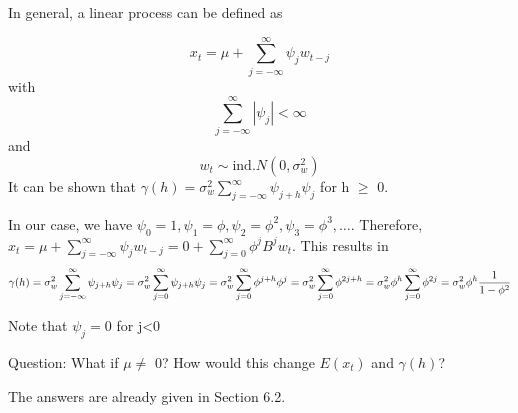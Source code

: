 \documentclass[
]{book}
\theoremstyle{definition}
\theoremstyle{definition}
\theoremstyle{definition}
\theoremstyle{definition}
\theoremstyle{remark}
\begin{document}
In general, a linear process can be defined as

\[x_t=\mu+\sum_{j=-\infty}^{\infty}\psi_jw_{t-j}\] with \[\sum_{j=-\infty}^{\infty}|\psi_j|<\infty\] and \[w_t\sim\mathrm{ind.}N(0,\sigma_w^2)\]
It can be shown that \(\gamma(h)=\sigma_w^2\sum_{j=-\infty}^{\infty} \psi_{j+h}\psi_j\) for h \(\ge\) 0.

In our case, we have \(\psi_0 = 1, \psi_1 = \phi, \psi_2 = \phi^2, \psi_3 = \phi^3, … .\) Therefore, \(x_t=\mu+\sum_{j=-\infty}^{\infty}\psi_jw_{t-j}=0+\sum_{j=0}^{\infty}\phi^jB^jw_t.\) This results in \[\gamma(h)=\sigma^2_w\sum_{j=-\infty}^{\infty}\psi_{j+h}\psi_j\\
=\sigma^2_w\sum_{j=0}^{\infty}\psi_{j+h}\psi_j\\
=\sigma^2_w\sum_{j=0}^{\infty}\phi^{j+h}\phi^j\\
=\sigma^2_w\sum_{j=0}^{\infty}\phi^{2j+h}\\
=\sigma^2_w\phi^h\sum_{j=0}^{\infty}\phi^{2j}\\
=\sigma^2_w\phi^h\frac{1}{1-\phi^2}\]

Note that \(\psi_j=0\) for j\textless0

Question: What if \(\mu\ne\) 0? How would this change \(E(x_t)\) and \(\gamma(h)\)?

The answers are already given in Section 6.2.
\end{document}
